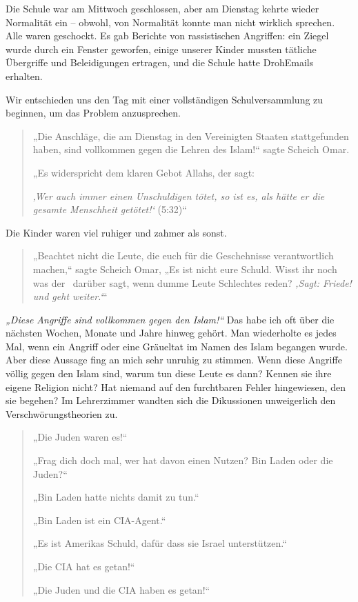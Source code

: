 \documentclass[12pt]{memoir}
\begin{document}
Die Schule war am Mittwoch geschlossen,
aber am Dienstag kehrte wieder Normalität ein –
obwohl, von Normalität konnte man nicht wirklich sprechen.
Alle waren geschockt.
Es gab Berichte von rassistischen Angriffen:
ein Ziegel wurde durch ein Fenster geworfen,
einige unserer Kinder mussten tätliche Übergriffe und Beleidigungen ertragen,
und die Schule hatte Droh\–Emails erhalten.

Wir entschieden uns den Tag mit einer vollständigen Schulversammlung
zu beginnen, um das Problem anzusprechen.

\begin{quote}
„Die Anschläge, die am Dienstag in den Vereinigten Staaten stattgefunden haben,
sind vollkommen gegen die Lehren des Islam!“ sagte Scheich Omar.

„Es widerspricht dem klaren Gebot Allahs, der sagt:

\emph{‚Wer auch immer einen Unschuldigen tötet, so ist es,
als hätte er die gesamte Menschheit getötet!‘} (5:32)“
\end{quote}

Die Kinder waren viel ruhiger und zahmer als sonst.

\begin{quote}
„Beachtet nicht die Leute,
die euch für die Geschehnisse verantwortlich machen,“
sagte Scheich Omar,
„Es ist nicht eure Schuld.
Wisst ihr noch was der \Quran\ darüber sagt,
wenn dumme Leute Schlechtes reden?
\emph{‚Sagt: Friede! und geht weiter.‘}“
\end{quote}

\emph{„Diese Angriffe sind vollkommen gegen den Islam!“}
Das habe ich oft über die nächsten Wochen, Monate und Jahre hinweg gehört.
Man wiederholte es jedes Mal, wenn ein Angriff oder eine Gräueltat
im Namen des Islam begangen wurde.
Aber diese Aussage fing an mich sehr unruhig zu stimmen.
Wenn diese Angriffe völlig gegen den Islam sind,
warum tun diese Leute es dann?
Kennen sie ihre eigene Religion nicht?
Hat niemand auf den furchtbaren Fehler hingewiesen, den sie begehen?
Im Lehrerzimmer wandten sich die Dikussionen
unweigerlich den Verschwörungstheorien zu.

\begin{quote}
„Die Juden waren es!“

„Frag dich doch mal, wer hat davon einen Nutzen? Bin Laden oder die Juden?“

„Bin Laden hatte nichts damit zu tun.“

„Bin Laden ist ein CIA-Agent.“

„Es ist Amerikas Schuld, dafür dass sie Israel unterstützen.“

„Die CIA hat es getan!“

„Die Juden und die CIA haben es getan!“
\end{quote}
\end{document}
